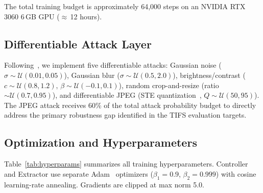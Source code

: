 \documentclass[journal]{IEEEtran}
\newcommand{\Ucal}{\mathcal{U}}
\begin{document}
The total training budget is approximately 64{,}000 steps on an NVIDIA RTX 3060 6\,GB GPU
($\approx$\,12 hours).

\subsection{Differentiable Attack Layer}
\label{sec:attacks}

Following~\cite{zhu2018hidden}, we implement five differentiable attacks: Gaussian noise
($\sigma\sim\Ucal(0.01,0.05)$), Gaussian blur ($\sigma\sim\Ucal(0.5,2.0)$),
brightness/contrast ($c\sim\Ucal(0.8,1.2),\,\beta\sim\Ucal(-0.1,0.1)$), random crop-and-resize
(ratio $\sim\Ucal(0.7,0.95)$), and differentiable JPEG (STE
quantization~\cite{bengio2013estimating}, $Q\sim\Ucal(50,95)$).
The JPEG attack receives 60\% of the total attack probability budget to directly address the
primary robustness gap identified in the TIFS evaluation targets.

\subsection{Optimization and Hyperparameters}
\label{sec:optimization}

Table~\ref{tab:hyperparams} summarizes all training hyperparameters.
Controller and Extractor use separate Adam~\cite{kingma2014adam} optimizers
($\beta_1=0.9$, $\beta_2=0.999$) with cosine learning-rate annealing.
Gradients are clipped at max norm 5.0.
\end{document}
